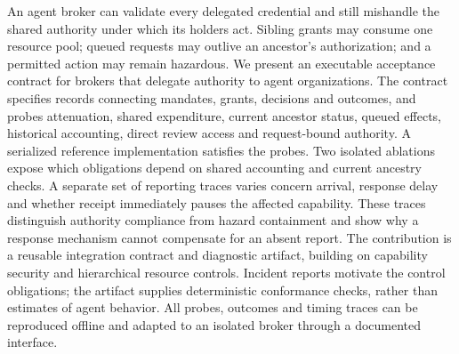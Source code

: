 An agent broker can validate every delegated credential and still mishandle the
shared authority under which its holders act. Sibling grants may consume one
resource pool; queued requests may outlive an ancestor's authorization; and a
permitted action may remain hazardous. We present an executable acceptance contract
for brokers that delegate authority to agent organizations. The contract specifies
records connecting mandates, grants, decisions and outcomes, and probes attenuation,
shared expenditure, current ancestor status, queued effects, historical accounting,
direct review access and request-bound authority. A serialized reference
implementation satisfies the probes. Two isolated ablations expose which obligations
depend on shared accounting and current ancestry checks. A separate set of reporting
traces varies concern arrival, response delay and whether receipt immediately pauses
the affected capability. These traces distinguish authority compliance from hazard
containment and show why a response mechanism cannot compensate for an absent report.
The contribution is a reusable integration contract and diagnostic artifact, building
on capability security and hierarchical resource controls. Incident reports motivate
the control obligations; the artifact supplies deterministic conformance checks,
rather than estimates of agent behavior. All probes, outcomes and timing traces can
be reproduced offline and adapted to an isolated broker through a documented interface.
